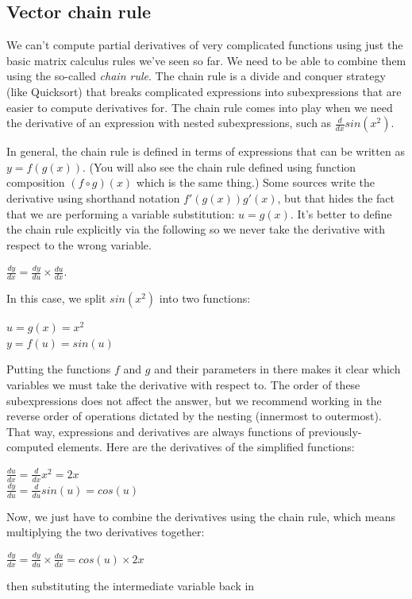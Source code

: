 \documentclass[11pt]{article}
\begin{document}
\subsection{Vector chain rule}

We can't compute partial derivatives of very complicated functions using just the basic matrix calculus rules we've seen so far. We need to be able to combine them using the so-called {\em chain rule}.  The chain rule is a divide and conquer strategy (like Quicksort) that breaks complicated expressions into subexpressions that are easier to compute derivatives for.  The chain rule comes into play when we need the derivative of an expression with nested subexpressions, such as $\frac{d}{dx} sin(x^2)$.  

In general, the chain rule is defined in terms of expressions that can be written as $y = f(g(x))$. (You will also see the chain rule defined using function composition $(f \circ g)(x)$ which is the same thing.)  Some sources write the derivative using shorthand notation $f'(g(x))g'(x)$, but that hides the fact that we are performing a variable substitution: $u = g(x)$. It's better to define the chain rule explicitly via the following so we never take the derivative with respect to the wrong variable.

$\frac{dy}{dx} = \frac{dy}{du} \times \frac{du}{dx}$.

In this case, we split $sin(x^2)$ into two functions:

$u = g(x) = x^2$\\
$y = f(u) = sin(u)$

Putting the functions $f$ and $g$ and their parameters in there makes it clear which variables we must take the derivative with respect to. The order of these subexpressions does not affect the answer, but we recommend working in the reverse order of operations dictated by the nesting (innermost to outermost). That way, expressions and derivatives are always functions of previously-computed elements. Here are the derivatives of the simplified functions:

$\frac{du}{dx} = \frac{d}{dx} x^2 = 2x$\\
$\frac{dy}{du} = \frac{d}{du} sin(u) = cos(u)$

Now, we just have to combine the derivatives using the chain rule, which means multiplying the two derivatives together:

$\frac{dy}{dx} = \frac{dy}{du} \times \frac{du}{dx} = cos(u) \times 2x$

then substituting the intermediate variable back in
\end{document}
